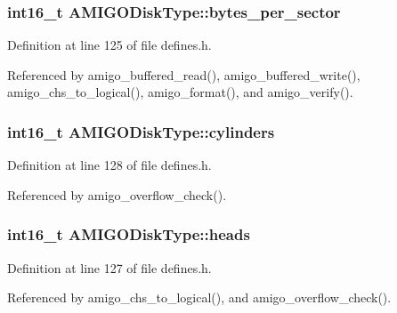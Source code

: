 \subsubsection[{\texorpdfstring{bytes\+\_\+per\+\_\+sector}{bytes_per_sector}}]{\setlength{\rightskip}{0pt plus 5cm}int16\+\_\+t A\+M\+I\+G\+O\+Disk\+Type\+::bytes\+\_\+per\+\_\+sector}\hypertarget{structAMIGODiskType_aaba90c38cd54cffcffefd43955f137c2}{}\label{structAMIGODiskType_aaba90c38cd54cffcffefd43955f137c2}


Definition at line 125 of file defines.\+h.



Referenced by amigo\+\_\+buffered\+\_\+read(), amigo\+\_\+buffered\+\_\+write(), amigo\+\_\+chs\+\_\+to\+\_\+logical(), amigo\+\_\+format(), and amigo\+\_\+verify().

\subsubsection[{\texorpdfstring{cylinders}{cylinders}}]{\setlength{\rightskip}{0pt plus 5cm}int16\+\_\+t A\+M\+I\+G\+O\+Disk\+Type\+::cylinders}\hypertarget{structAMIGODiskType_ae89d76a3143c33f3d61b0465ac2e8fe3}{}\label{structAMIGODiskType_ae89d76a3143c33f3d61b0465ac2e8fe3}


Definition at line 128 of file defines.\+h.



Referenced by amigo\+\_\+overflow\+\_\+check().

\subsubsection[{\texorpdfstring{heads}{heads}}]{\setlength{\rightskip}{0pt plus 5cm}int16\+\_\+t A\+M\+I\+G\+O\+Disk\+Type\+::heads}\hypertarget{structAMIGODiskType_ac24acfa9854cf9333d7aace761a739be}{}\label{structAMIGODiskType_ac24acfa9854cf9333d7aace761a739be}


Definition at line 127 of file defines.\+h.



Referenced by amigo\+\_\+chs\+\_\+to\+\_\+logical(), and amigo\+\_\+overflow\+\_\+check().

